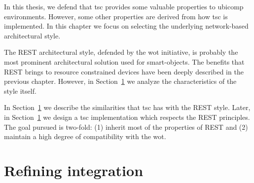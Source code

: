 In this thesis, we defend that \acf{tsc} provides some valuable properties to \ac{ubicomp} environments. %
However, some other properties are derived from how \ac{tsc} is implemented.
In this chapter we focus on selecting the underlying network-based architectural style.


The REST architectural style, defended by the \acf{wot} initiative, is probably the most prominent architectural solution used for smart-objects. %
The benefits that REST brings to resource constrained devices have been deeply described in the previous chapter.
However, in Section~\ref{} we analyze the characteristics of the style itself.

In Section~\ref{} we describe the similarities that \ac{tsc} has with the REST style.
Later, in Section~\ref{} we design a \ac{tsc} implementation which respects the REST principles.
The goal pursued is two-fold: (1) inherit most of the properties of REST and (2) maintain a high degree of compatibility with the \ac{wot}.










\section{Refining integration} %




